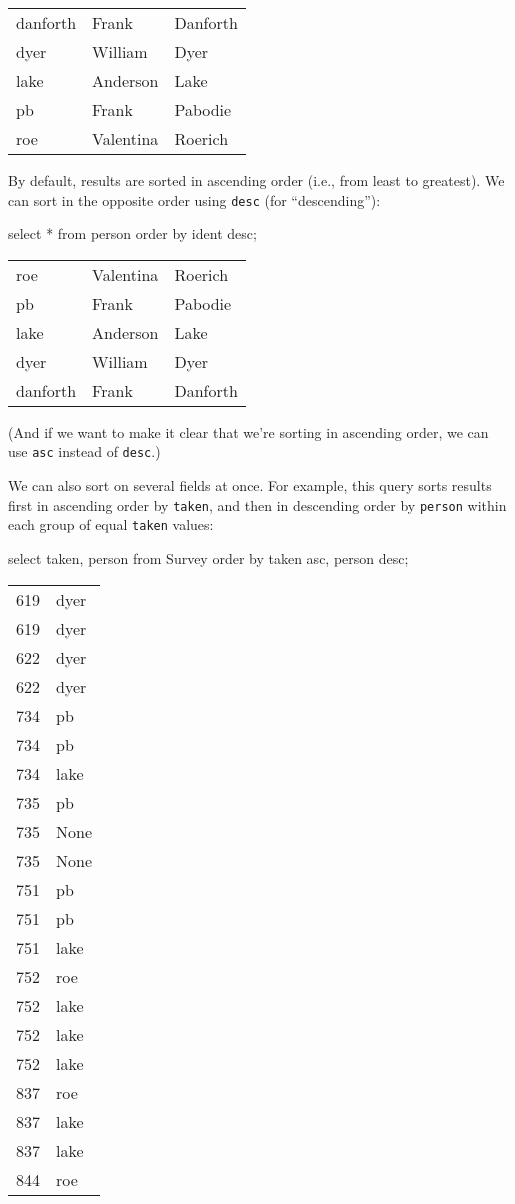 \documentclass{book}
\begin{document}
\begin{tabular}{lll}
danforth & Frank & Danforth \\
dyer & William & Dyer \\
lake & Anderson & Lake \\
pb & Frank & Pabodie \\
roe & Valentina & Roerich \\
\end{tabular}

By default, results are sorted in ascending order (i.e., from least to
greatest). We can sort in the opposite order using \texttt{desc} (for
``descending''):

\begin{VerbIn}
select * from person order by ident desc;
\end{VerbIn}

\begin{tabular}{lll}
roe & Valentina & Roerich \\
pb & Frank & Pabodie \\
lake & Anderson & Lake \\
dyer & William & Dyer \\
danforth & Frank & Danforth \\
\end{tabular}

(And if we want to make it clear that we're sorting in ascending order,
we can use \texttt{asc} instead of \texttt{desc}.)

We can also sort on several fields at once. For example, this query
sorts results first in ascending order by \texttt{taken}, and then in
descending order by \texttt{person} within each group of equal
\texttt{taken} values:

\begin{VerbIn}
select taken, person from Survey order by taken asc, person desc;
\end{VerbIn}

\begin{tabular}{ll}
619 & dyer \\
619 & dyer \\
622 & dyer \\
622 & dyer \\
734 & pb \\
734 & pb \\
734 & lake \\
735 & pb \\
735 & None \\
735 & None \\
751 & pb \\
751 & pb \\
751 & lake \\
752 & roe \\
752 & lake \\
752 & lake \\
752 & lake \\
837 & roe \\
837 & lake \\
837 & lake \\
844 & roe \\
\end{tabular}
\end{document}
